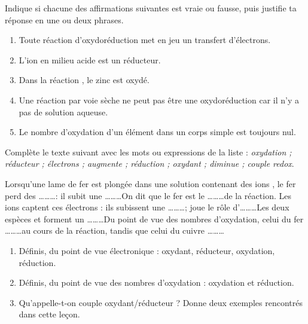 \documentclass[11pt]{article}
\begin{document}
\begin{exercice}
Indique si chacune des affirmations suivantes est vraie ou fausse, puis justifie ta réponse en une ou deux phrases.
\begin{enumerate}
\item Toute réaction d'oxydoréduction met en jeu un transfert d'électrons.
\item L'ion  en milieu acide est un réducteur.
\item Dans la réaction , le zinc est oxydé.
\item Une réaction par voie sèche ne peut pas être une oxydoréduction car il n'y a pas de solution aqueuse.
\item Le nombre d'oxydation d'un élément dans un corps simple est toujours nul.
\end{enumerate}
\end{exercice}

\begin{exercice}
Complète le texte suivant avec les mots ou expressions de la liste : \emph{oxydation ; réducteur ; électrons ; augmente ; réduction ; oxydant ; diminue ; couple redox}.

Lorsqu'une lame de fer est plongée dans une solution contenant des ions , le fer perd des \ldots\ldots\ldots : il subit une \ldots\ldots\ldots On dit que le fer est le \ldots\ldots\ldots de la réaction. Les ions  captent ces électrons : ils subissent une \ldots\ldots\ldots ;  joue le rôle d'\ldots\ldots\ldots Les deux espèces  et  forment un \ldots\ldots\ldots Du point de vue des nombres d'oxydation, celui du fer \ldots\ldots\ldots au cours de la réaction, tandis que celui du cuivre \ldots\ldots\ldots
\end{exercice}

\begin{exercice}
\begin{enumerate}
\item Définis, du point de vue électronique : oxydant, réducteur, oxydation, réduction.
\item Définis, du point de vue des nombres d'oxydation : oxydation et réduction.
\item Qu'appelle-t-on couple oxydant/réducteur ? Donne deux exemples rencontrés dans cette leçon.
\end{enumerate}
\end{exercice}
\end{document}
